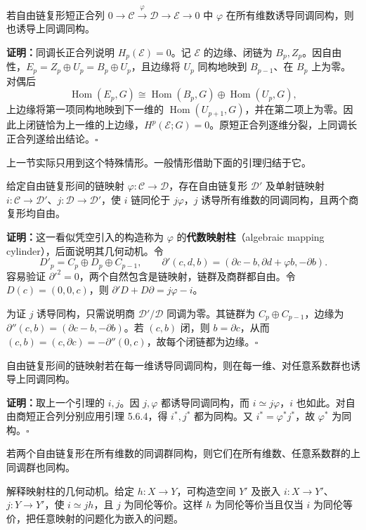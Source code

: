 若自由链复形短正合列 $0\to\mathcal C\xrightarrow{\varphi}\mathcal D\to\mathcal E\to0$ 中 $\varphi$ 在所有维数诱导同调同构，则也诱导上同调同构。

\textbf{证明：}同调长正合列说明 $H_p(\mathcal E)=0$。记 $\mathcal E$ 的边缘、闭链为 $B_p,Z_p$。因自由性，$E_p=Z_p\oplus U_p=B_p\oplus U_p$，且边缘将 $U_p$ 同构地映到 $B_{p-1}$、在 $B_p$ 上为零。对偶后
\[
\operatorname{Hom}(E_p,G)\cong\operatorname{Hom}(B_p,G)\oplus\operatorname{Hom}(U_p,G),
\]
上边缘将第一项同构地映到下一维的 $\operatorname{Hom}(U_{p+1},G)$，并在第二项上为零。因此上闭链恰为上一维的上边缘，$H^p(\mathcal E;G)=0$。原短正合列逐维分裂，上同调长正合列遂给出结论。\hfill$\square$

上一节实际只用到这个特殊情形。一般情形借助下面的引理归结于它。

给定自由链复形间的链映射 $\varphi:\mathcal C\to\mathcal D$，存在自由链复形 $\mathcal D'$ 及单射链映射 $i:\mathcal C\to\mathcal D'$、$j:\mathcal D\to\mathcal D'$，使 $i$ 链同伦于 $j\varphi$，$j$ 诱导所有维数的同调同构，且两个商复形均自由。

\textbf{证明：}这一看似凭空引入的构造称为 $\varphi$ 的\textbf{代数映射柱}（algebraic mapping cylinder），后面说明其几何动机。令
\[
D'_p=C_p\oplus D_p\oplus C_{p-1},\qquad
\partial'(c,d,b)=(\partial c-b,\partial d+\varphi b,-\partial b).
\]
容易验证 $\partial'^2=0$，两个自然包含是链映射，链群及商群都自由。令 $D(c)=(0,0,c)$，则 $\partial'D+D\partial=j\varphi-i$。

为证 $j$ 诱导同构，只需说明商 $\mathcal D'/\mathcal D$ 同调为零。其链群为 $C_p\oplus C_{p-1}$，边缘为 $\partial''(c,b)=(\partial c-b,-\partial b)$。若 $(c,b)$ 闭，则 $b=\partial c$，从而 $(c,b)=(c,\partial c)=-\partial''(0,c)$，故每个闭链都为边缘。\hfill$\square$

自由链复形间的链映射若在每一维诱导同调同构，则在每一维、对任意系数群也诱导上同调同构。

\textbf{证明：}取上一个引理的 $i,j$。因 $j,\varphi$ 都诱导同调同构，而 $i\simeq j\varphi$，$i$ 也如此。对自由商短正合列分别应用引理 5.6.4，得 $i^*,j^*$ 都为同构。又 $i^*=\varphi^*j^*$，故 $\varphi^*$ 为同构。\hfill$\square$

若两个自由链复形在所有维数的同调群同构，则它们在所有维数、任意系数群的上同调群也同构。

解释映射柱的几何动机。给定 $h:X\to Y$，可构造空间 $Y'$ 及嵌入 $i:X\to Y'$、$j:Y\to Y'$，使 $i\simeq jh$，且 $j$ 为同伦等价。这样 $h$ 为同伦等价当且仅当 $i$ 为同伦等价，把任意映射的问题化为嵌入的问题。


